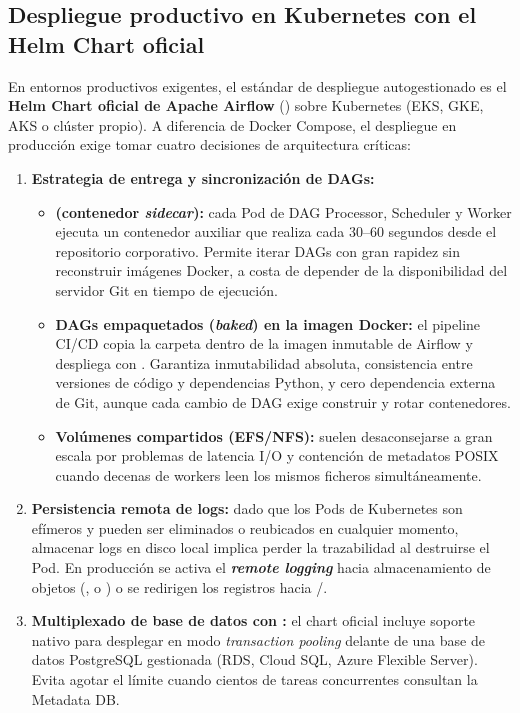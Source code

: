 \subsection{Despliegue productivo en Kubernetes con el Helm Chart oficial}\label{subsec:helm-kubernetes}

En entornos productivos exigentes, el estándar de despliegue autogestionado es el \textbf{Helm Chart oficial de Apache Airflow} () sobre Kubernetes (EKS, GKE, AKS o clúster propio). A diferencia de Docker Compose, el despliegue en producción exige tomar cuatro decisiones de arquitectura críticas:

\begin{enumerate}
  \item \textbf{Estrategia de entrega y sincronización de DAGs:}
  \begin{itemize}
    \item \textbf{ (contenedor \textit{sidecar}):} cada Pod de DAG Processor, Scheduler y Worker ejecuta un contenedor auxiliar que realiza  cada 30--60 segundos desde el repositorio corporativo. Permite iterar DAGs con gran rapidez sin reconstruir imágenes Docker, a costa de depender de la disponibilidad del servidor Git en tiempo de ejecución.
    \item \textbf{DAGs empaquetados (\textit{baked}) en la imagen Docker:} el pipeline CI/CD copia la carpeta  dentro de la imagen inmutable de Airflow y despliega con . Garantiza inmutabilidad absoluta, consistencia entre versiones de código y dependencias Python, y cero dependencia externa de Git, aunque cada cambio de DAG exige construir y rotar contenedores.
    \item \textbf{Volúmenes compartidos (EFS/NFS):} suelen desaconsejarse a gran escala por problemas de latencia I/O y contención de metadatos POSIX cuando decenas de workers leen los mismos ficheros simultáneamente.
  \end{itemize}
  \item \textbf{Persistencia remota de logs:} dado que los Pods de Kubernetes son efímeros y pueden ser eliminados o reubicados en cualquier momento, almacenar logs en disco local implica perder la trazabilidad al destruirse el Pod. En producción se activa el \textbf{\textit{remote logging}} hacia almacenamiento de objetos (,  o ) o se redirigen los registros hacia /.
  \item \textbf{Multiplexado de base de datos con :} el chart oficial incluye soporte nativo para desplegar  en modo \textit{transaction pooling} delante de una base de datos PostgreSQL gestionada (RDS, Cloud SQL, Azure Flexible Server). Evita agotar el límite  cuando cientos de tareas concurrentes consultan la Metadata DB.

\end{enumerate}
